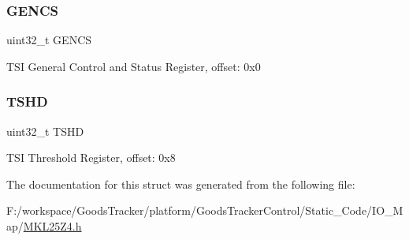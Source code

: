 \subsubsection{\texorpdfstring{G\+E\+N\+CS}{GENCS}}
{\footnotesize\ttfamily uint32\+\_\+t G\+E\+N\+CS}

T\+SI General Control and Status Register, offset\+: 0x0 \mbox{\label{struct_t_s_i___mem_map_a85a27c0645c0102ceea4ce506b84194e}} 
\subsubsection{\texorpdfstring{T\+S\+HD}{TSHD}}
{\footnotesize\ttfamily uint32\+\_\+t T\+S\+HD}

T\+SI Threshold Register, offset\+: 0x8 

The documentation for this struct was generated from the following file\+:\begin{DoxyCompactItemize}
\item 
F\+:/workspace/\+Goods\+Tracker/platform/\+Goods\+Tracker\+Control/\+Static\+\_\+\+Code/\+I\+O\+\_\+\+Map/\hyperlink{_m_k_l25_z4_8h}{M\+K\+L25\+Z4.\+h}\end{DoxyCompactItemize}
